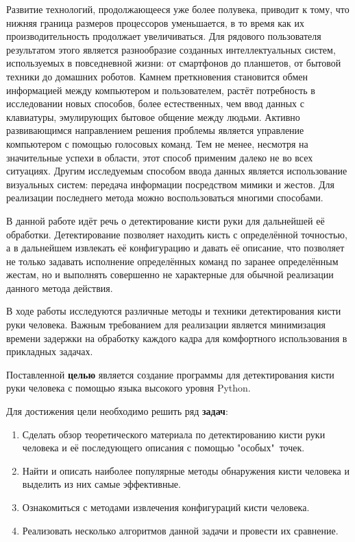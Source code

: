 Развитие технологий, продолжающееся уже более полувека, приводит к тому, что нижняя граница
размеров процессоров уменьшается, в то время как их производительность продолжает
увеличиваться. Для рядового пользователя результатом этого является разнообразие созданных
интеллектуальных систем, используемых в повседневной жизни: от смартфонов до планшетов, от
бытовой техники до домашних роботов. Камнем преткновения становится обмен информацией между
компьютером и пользователем, растёт потребность в исследовании новых способов, более 
естественных, чем ввод данных с клавиатуры, эмулирующих бытовое общение между людьми. 
Активно развивающимся направлением решения проблемы является управление компьютером с помощью 
голосовых команд. Тем не менее, несмотря на значительные успехи в области, этот способ
применим далеко не во всех ситуациях. Другим исследуемым способом ввода данных является
использование визуальных систем: передача информации посредством мимики и жестов. Для реализации
последнего метода можно воспользоваться многими способами. 

В данной работе идёт речь о детектирование кисти руки для дальнейшей её обработки.
Детектирование позволяет находить кисть с определённой точностью, а в
дальнейшем извлекать её конфигурацию и давать её описание, что позволяет не только задавать исполнение определённых 
команд по заранее определённым жестам, но и выполнять совершенно не характерные для обычной
реализации данного метода действия.

В ходе работы исследуются различные методы и техники детектирования кисти руки человека.
Важным требованием для реализации является минимизация времени
задержки на обработку каждого кадра для комфортного использования в прикладных задачах.

Поставленной {\bf целью} является создание программы для детектирования кисти руки человека 
с помощью языка высокого уровня Python.

Для достижения цели необходимо решить ряд {\bf задач}:
\begin{enumerate}
	\item Сделать обзор теоретического материала по детектированию кисти руки человека и 
её последующего описания с помощью "особых"\ точек.
	\item Найти и описать наиболее популярные методы обнаружения кисти человека и выделить из них самые эффективные.
	\item Ознакомиться с методами извлечения конфигураций кисти человека.
	\item Реализовать несколько алгоритмов данной задачи и провести их сравнение.
\end{enumerate}